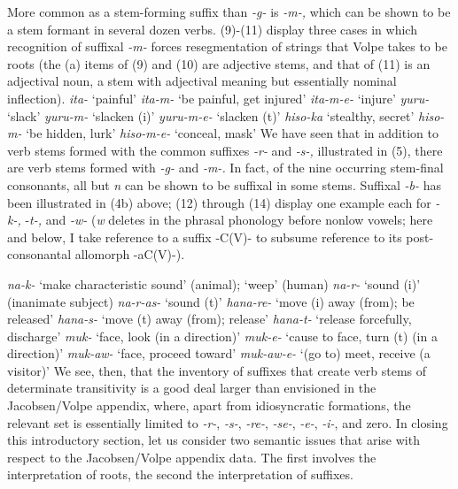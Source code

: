 \documentclass[output=paper,
modfonts
]{LSP/langsci}
\begin{document}
More common as a stem-forming suffix than \textit{-g-} is \textit{-m-,}
which can be shown to be a stem formant in several dozen verbs. (9)-(11)
display three cases in which recognition of suffixal \textit{-m-} forces
resegmentation of strings that Volpe takes to be roots (the (a) items of
(9) and (10) are adjective stems, and that of (11) is an adjectival
noun, a stem with adjectival meaning but essentially nominal
inflection).
\ea
	 \ea \textit{ita-} `painful'
	 \ex \textit{ita-m-} `be painful, get injured'
	 \ex \textit{ita-m-e-} `injure'
	\z
\ex 
	 \ea \textit{yuru-} `slack'
	 \ex \textit{yuru-m-} `slacken (i)'
	 \ex \textit{yuru-m-e-} `slacken (t)'
	\z
\ex
	 \ea \textit{hiso-ka} `stealthy, secret'
	 \ex \textit{hiso-m-} `be hidden, lurk'
	 \ex \textit{hiso-m-e-} `conceal, mask'
	\z
\z
We have seen that in addition to verb stems formed with the common
suffixes \textit{-r-} and \textit{-s-,} illustrated in (5), there are verb
stems formed with \textit{-g-} and \textit{-m-.} In fact, of the nine
occurring stem-final consonants, all but \textit{n} can be shown to be
suffixal in some stems. Suffixal \textit{-b-} has been illustrated in (4b)
above; (12) through (14) display one example each for \textit{-k-,}
-\textit{t-,} and \textit{-w-} (\textit{w} deletes in the phrasal phonology
before nonlow vowels; here and below, I take reference to a suffix
-C(V)- to subsume reference to its post-consonantal allomorph -aC(V)-).

\ea
	 \ea \textit{na-k-} `make characteristic sound' (animal); `weep' (human)
	 \ex \textit{na-r-} `sound (i)' (inanimate subject)
	 \ex \textit{na-r-as-} `sound (t)'
	\z
\ex 
	 \ea \textit{hana-re-} `move (i) away (from); be released'
	 \ex \textit{hana-s-} `move (t) away (from); release'
	 \ex \textit{hana-t-} `release forcefully, discharge'
	\z
\ex 
	 \ea \textit{muk-} `face, look (in a direction)'
	 \ex \textit{muk-e-} `cause to face, turn (t) (in a direction)'
	 \ex \textit{muk-aw-} `face, proceed toward'
	 \ex \textit{muk-aw-e-} `(go to) meet, receive (a visitor)'
	\z
\z
We see, then, that the inventory of suffixes that create verb stems of
determinate transitivity is a good deal larger than envisioned in the
Jacobsen/Volpe appendix, where, apart from idiosyncratic formations, the
relevant set is essentially limited to \textit{-r-}, \textit{-s-},
\textit{-re-}, \textit{-se-}, \textit{-e-}, \textit{-i-}, and zero. In closing
this introductory section, let us consider two semantic issues that
arise with respect to the Jacobsen/Volpe appendix data. The first
involves the interpretation of roots, the second the interpretation of
suffixes.
\end{document}
